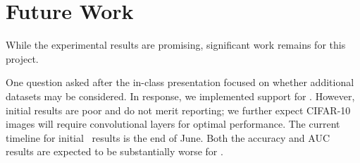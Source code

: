 \section{Future Work}

While the experimental results are promising, significant work remains for this project.

One question asked after the in-class presentation focused on whether additional datasets may be considered.  In response, we implemented support for \CIFARten.  However, initial results are poor and do not merit reporting; we further expect CIFAR-10 images will require convolutional layers for optimal performance.  The current timeline for initial \CIFARten\ results is the end of June.  Both the accuracy and AUC results are expected to be substantially worse for \CIFARten.
